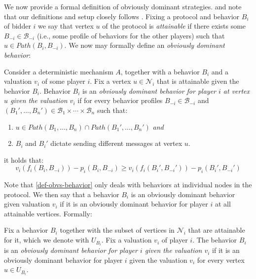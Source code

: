 We now provide a formal definition of obviously dominant strategies. 
and note that our definitions and setup closely follows \cite{Ron24}.  Fixing a protocol and behavior $B_i$ of bidder $i$ we say that vertex $u$ of the protocol is \emph{attainable} if there exists some $B_{-i}\in \mathcal{B}_{-i}$ (i.e., some profile of behaviors for the other players) such that $u\in Path(B_i,B_{-i})$. 
We now may formally define an \emph{obviously dominant behavior}:
\begin{definition}\label{def-obvs-behavior}
Consider a deterministic mechanism $A$, together with a behavior $B_i$ and a valuation $v_i$ of some player $i$.
Fix a vertex $u\in \mathcal N_i$ that is attainable given the behavior $B_i$. 
Behavior $B_i$ is an \emph{obviously dominant behavior for player $i$ at vertex $u$ given the valuation $v_i$} if for every behavior profiles $B_{-i}\in \mathcal B_{-i}$ and  $(B_1',\ldots,B_n')\in \mathcal B_1 \times \cdots \times \mathcal{B}_n$ such that:
\begin{enumerate}
    \item $u\in Path(B_1,\ldots,B_n)\cap Path(B_1',\ldots,B_n')$ \emph{and} 
    \item $B_i$ and $B_i'$ dictate sending different messages at vertex $u$.
\end{enumerate}
it holds that:
$$
v_i(f_i(B_i,B_{-i})) - p_i(B_i,B_{-i}) \geq v_i(f_i(B_i',B_{-i}')) - p_i(B_i',B_{-i}')
$$
\end{definition}

Note that \cref{def-obvs-behavior} only deals with behaviors at individual nodes in the protocol.  We then say that a behavior $B_i$ is an obviously dominant behavior given valuation $v_i$ if it is an obviously dominant behavior for player $i$ at
all  attainable vertices.  Formally:
\begin{definition}
Fix a behavior $B_i$ together with the subset of vertices in $\mathcal N_i$ that are attainable for it,  which we denote with $U_{B_i}$. Fix a valuation $v_i$ of player $i$.
The behavior $B_i$ is an \emph{obviously dominant behavior for player $i$ given the valuation $v_i$} if
it is an obviously dominant behavior for player $i$ given the valuation $v_i$ for every vertex $u\in U_{B_i}$. 
\end{definition} 

